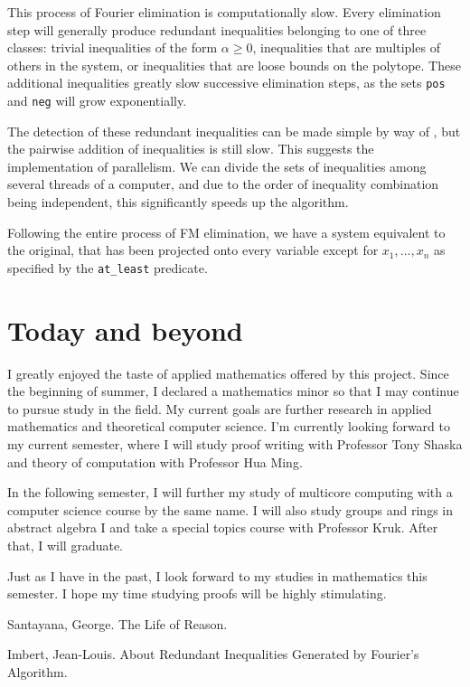 \documentclass[12pt]{amsart}
\begin{document}
This process of Fourier elimination is computationally slow. Every elimination step will generally produce redundant inequalities belonging to one of three classes: trivial inequalities of the form $\alpha \geq 0$, inequalities that are multiples of others in the system, or inequalities that are loose bounds on the polytope. These additional inequalities greatly slow successive elimination steps, as the sets \texttt{pos} and \texttt{neg} will grow exponentially.

The detection of these redundant inequalities can be made simple by way of \cite{imbert-1}, but the pairwise addition of inequalities is still slow. This suggests the implementation of parallelism. We can divide the sets of inequalities among several threads of a computer, and due to the order of inequality combination being independent, this significantly speeds up the algorithm.

Following the entire process of FM elimination, we have a system equivalent to the original, that has been projected onto every variable except for $x_1, \ldots, x_n$ as specified by the \texttt{at\_least} predicate.


\section{Today and beyond}

I greatly enjoyed the taste of applied mathematics offered by this project. Since the beginning of summer, I declared a mathematics minor so that I may continue to pursue study in the field. My current goals are further research in applied mathematics and theoretical computer science. I'm currently looking forward to my current semester, where I will study proof writing with Professor Tony Shaska and theory of computation with Professor Hua Ming.

In the following semester, I will further my study of multicore computing with a computer science course by the same name. I will also study groups and rings in abstract algebra I and take a special topics course with Professor Kruk. After that, I will graduate.

Just as I have in the past, I look forward to my studies in mathematics this semester. I hope my time studying proofs will be highly stimulating.













\begin{thebibliography}{50}

 
 Santayana, George.
The Life of Reason.

 Imbert, Jean-Louis.
About Redundant Inequalities Generated by Fourier's Algorithm.

\end{thebibliography}
\end{document}
